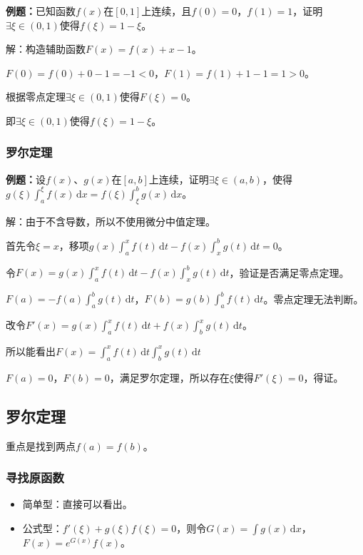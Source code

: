 \documentclass[UTF8, 12pt]{ctexart}
\begin{document}
\textbf{例题：}已知函数$f(x)$在$[0,1]$上连续，且$f(0)=0$，$f(1)=1$，证明$\exists\xi\in(0,1)$使得$f(\xi)=1-\xi$。

解：构造辅助函数$F(x)=f(x)+x-1$。

$F(0)=f(0)+0-1=-1<0$，$F(1)=f(1)+1-1=1>0$。

根据零点定理$\exists\xi\in(0,1)$使得$F(\xi)=0$。

即$\exists\xi\in(0,1)$使得$f(\xi)=1-\xi$。

\subsubsection{罗尔定理}

\textbf{例题：}设$f(x)$、$g(x)$在$[a,b]$上连续，证明$\exists\xi\in(a,b)$，使得$g(\xi)\int_a^\xi f(x)\,\textrm{d}x=f(\xi)\int_\xi^bg(x)\,\textrm{d}x$。

解：由于不含导数，所以不使用微分中值定理。

首先令$\xi=x$，移项$g(x)\int_a^xf(t)\,\textrm{d}t-f(x)\int_x^bg(t)\,\textrm{d}t=0$。

令$F(x)=g(x)\int_a^xf(t)\,\textrm{d}t-f(x)\int_x^bg(t)\,\textrm{d}t$，验证是否满足零点定理。

$F(a)=-f(a)\int_a^bg(t)\,\textrm{d}t$，$F(b)=g(b)\int_a^bf(t)\,\textrm{d}t$。零点定理无法判断。

改令$F'(x)=g(x)\int_a^xf(t)\,\textrm{d}t+f(x)\int_b^xg(t)\,\textrm{d}t$。

所以能看出$F(x)=\int_a^xf(t)\,\textrm{d}t\int_b^xg(t)\,\textrm{d}t$

$F(a)=0$，$F(b)=0$，满足罗尔定理，所以存在$\xi$使得$F'(\xi)=0$，得证。

\subsection{罗尔定理}

重点是找到两点$f(a)=f(b)$。

\subsubsection{寻找原函数}


\begin{itemize}
    \item 简单型：直接可以看出。
    \item 公式型：$f'(\xi)+g(\xi)f(\xi)=0$，则令$G(x)=\int g(x)\,\textrm{d}x$，$F(x)=e^{G(x)}f(x)$。
\end{itemize}
\end{document}
